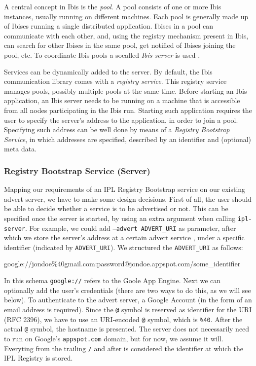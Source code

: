 A central concept in Ibis is the \emph{pool}. A pool consists of one or more Ibis
instances, usually running on different machines. Each pool is generally made up
of Ibises running a single distributed application. Ibises in a pool can
communicate with each other, and, using the registry mechanism present in Ibis,
can search for other Ibises in the same pool, get notified of Ibises joining the
pool, etc. To coordinate Ibis pools a socalled \emph{Ibis server} is used
\cite{ipl-usersguide}.

Services can be dynamically added to the server. By default, the Ibis
communication library comes with a \emph{registry service}. This registry
service manages pools, possibly multiple pools at the same time. Before starting
an Ibis application, an Ibis server needs to be running on a machine that is
accessible from all nodes participating in the Ibis run. Starting such
application requires the user to specify the server's address to the
application, in order to join a pool. Specifying such address can be well done
by means of a \emph{Registry Bootstrap Service}, in which addresses are
specified, described by an identifier and (optional) meta data.

\subsubsection{Registry Bootstrap Service (Server)}
Mapping our requirements of an IPL Registry Bootstrap service on our existing
advert server, we have to make some design decisions. First of all, the user
should be able to decide whether a service is to be advertised or not. This can
be specified once the server is started, by using an extra argument when calling
\texttt{ipl-server}. For example, we could add \texttt{--advert ADVERT\_URI} as
parameter, after which we store the server's address at a certain advert service
, under a specific identifier (indicated by \texttt{ADVERT\_URI}). We structured
the \texttt{ADVERT\_URI} as follows:

\begin{center}
\begin{code}
google://jondoe\%40gmail.com:password@jondoe.appspot.com/some_identifier
\end{code}
\end{center}

In this schema \texttt{google://} refers to the Goole App Engine. Next we can
optionally add the user's credentials (there are two ways to do this, as we
will see below). To authenticate to the advert server, a Google Account (in
the form of an email address is required). Since the \texttt{@} symbol is
reserved as identifier for the URI (RFC 2396), we have to use an URI-encoded
\texttt{@} symbol, which is \texttt{\%40}. After the actual \texttt{@}
symbol, the hostname is presented. The server does not necessarily need to run
on Google's \texttt{appspot.com} domain, but for now, we assume it will.
Everyting from the trailing \texttt{/} and after is considered the identifier at
which the IPL Registry is stored.


